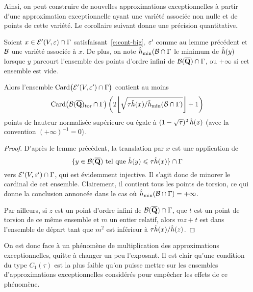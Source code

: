 Ainsi, on peut construire de nouvelles approximations exceptionnelles à partir
d'une approximation exceptionnelle ayant une variété associée non nulle et de
points de cette variété. Le corollaire suivant donne une précision
quantitative.

\begin{coro} \label{c:factory}
  Soient \( x \in \mathcal E'(V, \varepsilon) \cap \Gamma \)
  satisfaisant~\eqref{e:cont-big}, \( \varepsilon' \) comme au lemme précédent et \(
    \mathcal B \) une variété associée à \( x \). De plus, on note
  \( \hat h_{\mathrm{min}}(\mathcal B \cap \Gamma \) le minimum de \( \hat h (y) \) lorsque \( y \)
  parcourt l'ensemble des points d'ordre infini de
  \( \mathcal B(\overline{{\mathbf{Q}}}) \cap \Gamma \), ou \( +\infty \) si cet ensemble est vide.

  Alors l'ensemble
  \(
    \operatorname{Card} \bigl( \mathcal E'(V, \varepsilon') \cap \Gamma \bigr)
  \) contient au moins
  \begin{equation}
    \card \bigl( \vai(\Qbar)_\torsion \cap \grp \bigr)
    \left(
      2 \floor*{ \sqrt{ \tau \hautn x / \hmin(\vai \cap \grp) } } + 1
    \right)
  \end{equation}
  points de hauteur normalisée supérieure ou égale à
  \( (1-\sqrt\tau)^{2} \, \hat h (x) \) (avec la convention \( (+\infty)^{-1} =
    0 \)).
\end{coro}

\begin{proof}
  D'après le lemme précédent, la translation par \( x \) est une application
  de
  \begin{equation}
    \lbrace
      y \in \mathcal B(\overline{{\mathbf{Q}}})
      \text{ tel que }
      \hat h (y) \leqslant \tau \hat h (x)
    \rbrace
    \cap \Gamma
  \end{equation}
  vers \( \mathcal E'(V, \varepsilon') \cap \Gamma \), qui est évidemment injective. Il
  s'agit donc de minorer le cardinal de cet ensemble. Clairement, il contient
  tous les points de torsion, ce qui donne la conclusion annoncée dans le cas
  où \( \hat h_{\mathrm{min}}(\mathcal B \cap \Gamma) = + \infty \).

  Par ailleurs, si \( z \) est un point d'ordre infini de
  \( \mathcal B(\overline{{\mathbf{Q}}}) \cap \Gamma \), que \( t \) est un point de torsion de ce même
  ensemble et \( m \) un entier relatif, alors \( m z + t \) est dans
  l'ensemble de départ tant que \( m^2 \) est inférieur à
  \( \tau \hat h (x) / \hat h (z) \).
\end{proof}

On est donc face à un phénomène de multiplication des approximations
exceptionnelles, quitte à changer un peu l'exposant. Il est clair qu'une
condition du type \( C_1(\tau) \) est la plus faible qu'on puisse mettre sur
les ensembles d'approximations exceptionnelles considérés pour empêcher les
effets de ce phénomène.

